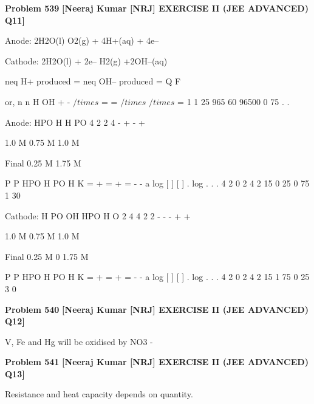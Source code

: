 \begin{problembox}
\textbf{Problem 539} \hfill \textbf{[Neeraj Kumar [NRJ] EXERCISE II (JEE ADVANCED) Q11]}
\label{q:ext-nrj_all_questions-539}

Anode: 2H2O(l) 
 O2(g) + 4H+(aq) + 4e--
 
 Cathode: 2H2O(l) + 2e-- 
 H2(g) +2OH--(aq)
 
 neq H+ produced = neq OH-- produced = Q
F
 
 or, n
n
H
OH
+
-
$/times$ =
=
$/times$
$/times$
=
1
1 25
965
60
96500
0 75
.
.
 
 Anode: HPO
H
H PO
4
2
2
4
-
+
-
+

  


 



 
                 1.0 M   0.75 M       1.0 M
 
 Final     0.25 M                    1.75 M
 
   P
P
HPO
H PO
H
K
=
+
=
+
=
-
-
a
log [
]
[
]
.
log .
.
.
4
2
0
2
4
2 15
0 25
0 75
1 30
 
 Cathode: H PO
OH
HPO
H O
2
4
4
2
2
-
-
-
+
+

  


 



 
                    1.0 M    0.75 M       1.0 M
 
 Final        0.25 M         0            1.75 M
 
   P
P
HPO
H PO
H
K
=
+
=
+
=
-
-
a
log [
]
[
]
.
log .
.
.
4
2
0
2
4
2 15
1 75
0 25
3 0
\end{problembox}

\begin{problembox}
\textbf{Problem 540} \hfill \textbf{[Neeraj Kumar [NRJ] EXERCISE II (JEE ADVANCED) Q12]}
\label{q:ext-nrj_all_questions-540}

V, Fe and Hg will be oxidised by NO3
-
\end{problembox}

\begin{problembox}
\textbf{Problem 541} \hfill \textbf{[Neeraj Kumar [NRJ] EXERCISE II (JEE ADVANCED) Q13]}
\label{q:ext-nrj_all_questions-541}

Resistance and heat capacity depends on quantity.
\end{problembox}

